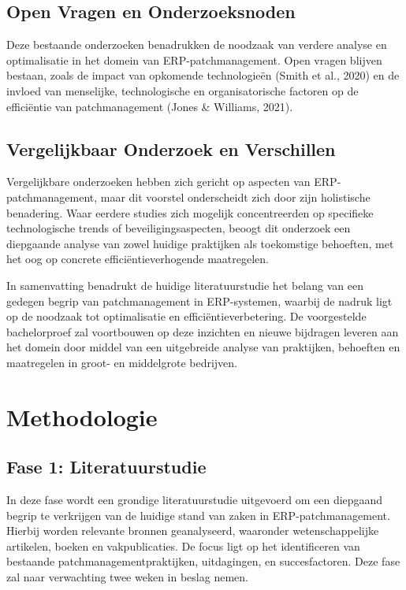 \subsection{Open Vragen en Onderzoeksnoden}

Deze bestaande onderzoeken benadrukken de noodzaak van verdere analyse en optimalisatie in het domein van ERP-patchmanagement. Open vragen blijven bestaan, zoals de impact van opkomende technologieën (Smith et al., 2020) en de invloed van menselijke, technologische en organisatorische factoren op de efficiëntie van patchmanagement (Jones & Williams, 2021).

\subsection{Vergelijkbaar Onderzoek en Verschillen}

Vergelijkbare onderzoeken hebben zich gericht op aspecten van ERP-patchmanagement, maar dit voorstel onderscheidt zich door zijn holistische benadering. Waar eerdere studies zich mogelijk concentreerden op specifieke technologische trends of beveiligingsaspecten, beoogt dit onderzoek een diepgaande analyse van zowel huidige praktijken als toekomstige behoeften, met het oog op concrete efficiëntieverhogende maatregelen.

In samenvatting benadrukt de huidige literatuurstudie het belang van een gedegen begrip van patchmanagement in ERP-systemen, waarbij de nadruk ligt op de noodzaak tot optimalisatie en efficiëntieverbetering. De voorgestelde bachelorproef zal voortbouwen op deze inzichten en nieuwe bijdragen leveren aan het domein door middel van een uitgebreide analyse van praktijken, behoeften en maatregelen in groot- en middelgrote bedrijven.




\section{Methodologie}%
\label{sec:methodologie}


\subsection{Fase 1: Literatuurstudie}

In deze fase wordt een grondige literatuurstudie uitgevoerd om een diepgaand begrip te verkrijgen van de huidige stand van zaken in ERP-patchmanagement. Hierbij worden relevante bronnen geanalyseerd, waaronder wetenschappelijke artikelen, boeken en vakpublicaties. De focus ligt op het identificeren van bestaande patchmanagementpraktijken, uitdagingen, en succesfactoren. Deze fase zal naar verwachting twee weken in beslag nemen.

